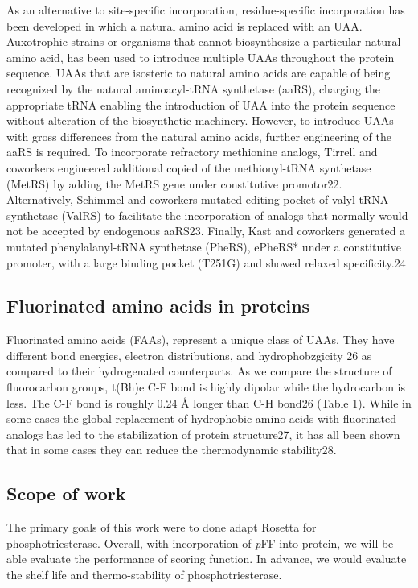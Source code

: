 \begin{refsection}
As an alternative to site-specific incorporation, residue-specific
incorporation has been developed in which a natural amino acid is replaced with
an UAA. Auxotrophic strains or organisms that cannot biosynthesize a particular
natural amino acid, has been used to introduce multiple UAAs throughout the
protein sequence. UAAs that are isosteric to natural amino acids are capable of
being recognized by the natural aminoacyl-tRNA synthetase (aaRS), charging the
appropriate tRNA enabling the introduction of UAA into the protein sequence
without alteration of the biosynthetic machinery. However, to introduce UAAs
with gross differences from the natural amino acids, further engineering of the
aaRS is required. To incorporate refractory methionine analogs, Tirrell and
coworkers engineered additional copied of the methionyl-tRNA synthetase (MetRS)
by adding the MetRS gene under constitutive promotor22. Alternatively, Schimmel
and coworkers mutated editing pocket of valyl-tRNA synthetase (ValRS) to
facilitate the incorporation of analogs that normally would not be accepted by
endogenous aaRS23. Finally, Kast and coworkers generated a mutated
phenylalanyl-tRNA synthetase (PheRS), ePheRS* under a constitutive promoter,
with a large binding pocket (T251G) and showed relaxed specificity.24

\subsection{Fluorinated amino acids in proteins} 
\label{sec:faa}

Fluorinated amino acids (FAAs), represent a unique class of UAAs. They have
different bond energies, electron distributions, and hydrophobzgicity 26 as
compared to their hydrogenated counterparts. As we compare the structure of
fluorocarbon groups, t(Bh)e C-F bond is highly dipolar while the hydrocarbon is
less. The C-F bond is roughly 0.24 {\AA} longer than C-H bond26 (Table 1). While in
some cases the global replacement of hydrophobic amino acids with fluorinated
analogs has led to the stabilization of protein structure27, it has all been
shown that in some cases they can reduce the thermodynamic stability28.

\subsection{Scope of work}

The primary goals of this work were to done adapt Rosetta for
phosphotriesterase. Overall, with incorporation of \emph{p}FF into protein, we
will be able evaluate the performance of scoring function. In advance, we would
evaluate the shelf life and thermo-stability of phosphotriesterase.


\end{refsection}
